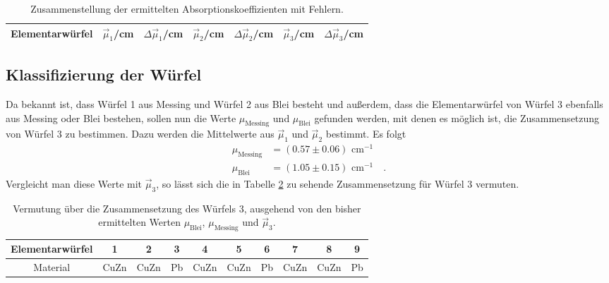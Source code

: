\begin{table}
\centering
\begin{tabular}{c|cc|cc|cc}
\toprule \midrule
Elementarwürfel & $\vec{\mu}_1$/cm & $\Delta \vec{\mu}_1$/cm& $\vec{\mu}_2$/cm & $\Delta \vec{\mu}_2$/cm& $\vec{\mu}_3$/cm & $\Delta \vec{\mu}_3$/cm \\
\midrule

\midrule
\bottomrule
\end{tabular}
\caption{Zusammenstellung der ermittelten Absorptionskoeffizienten mit Fehlern.}
\label{Ergebnis}
\end{table}
\clearpage
\subsection{Klassifizierung der Würfel}
Da bekannt ist, dass Würfel 1 aus Messing und Würfel 2 aus Blei besteht und außerdem, dass
die Elementarwürfel von Würfel 3 ebenfalls aus Messing oder Blei bestehen, sollen nun
die Werte $\mu_\text{Messing}$ und $\mu_\text{Blei}$ gefunden werden, mit denen es möglich ist,
die Zusammensetzung von Würfel 3 zu bestimmen.
Dazu werden die Mittelwerte aus $\vec{\mu}_1$ und $\vec{\mu}_2$ bestimmt. Es folgt
\begin{align}
\mu_\text{Messing}&=(0.57 \pm 0.06) \text{ cm}^{-1}\\
\mu_\text{Blei}&=(1.05 \pm 0.15) \text{ cm}^{-1} \quad .
\end{align}
Vergleicht man diese Werte mit $\vec{\mu}_3$, so lässt sich die in Tabelle \ref{Zusammensetzung}
zu sehende Zusammensetzung für Würfel 3 vermuten.
\begin{table}[h]
\centering
\begin{tabular}{cccccccccc}
\toprule \midrule
Elementarwürfel 	& 1&2&3&4&5&6&7&8&9 \\
\midrule
	Material&CuZn &CuZn &Pb	&CuZn &CuZn &Pb &CuZn &CuZn & Pb\\
\midrule
\bottomrule
\end{tabular}
\caption{Vermutung über die Zusammensetzung des Würfels 3, ausgehend von den bisher ermittelten
Werten $\mu_\text{Blei}$, $\mu_\text{Messing}$ und $\vec{\mu}_3$.}
\label{Zusammensetzung}
\end{table}
\clearpage
